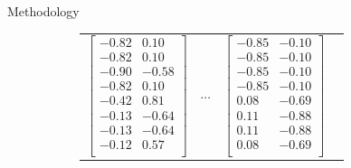\documentclass[12pt]{amsart}
\begin{document}
\begin{section}{Methodology}
\begin{figure}
\begin{subfigure}[c]{1\textwidth}
\begin{tabular}{llll}
                    $\begin{bmatrix}
                        -0.82  &  0.10\\
                        -0.82  &  0.10\\
                        -0.90 & -0.58\\
                        -0.82  &  0.10\\
                        -0.42 &  0.81\\
                        -0.13  & -0.64\\
                        -0.13  & -0.64\\
                        -0.12 &  0.57\\
                    \end{bmatrix}$
                
                &
                $\cdots$
                &
                
                    $\begin{bmatrix}
                        -0.85 &  -0.10\\
                        -0.85 &  -0.10\\
                        -0.85 &  -0.10\\
                        -0.85 &  -0.10\\
                         0.08 &  -0.69\\
                         0.11 &  -0.88\\
                         0.11 &  -0.88\\
                         0.08 &  -0.69\\
                    \end{bmatrix}$
                \end{tabular}

            \end{subfigure}
            

\end{figure}
\end{section}
\end{document}
